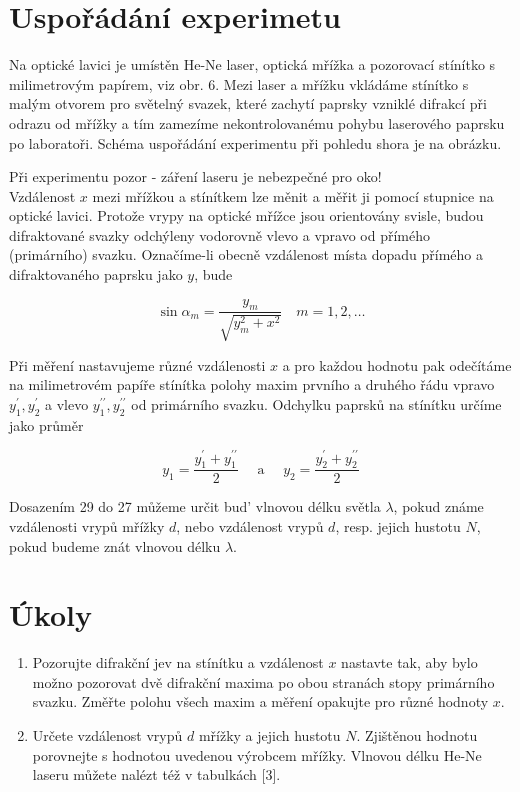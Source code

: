 \documentclass[czech,11pt,a4paper]{article}
\begin{document}
\begin{multicols}{2}
	
	
	\section*{Uspořádání experimetu}
	Na optické lavici je umístěn He-Ne laser, optická mřížka a pozorovací stínítko s milimetrovým papírem, viz obr. 6. Mezi laser a mřížku vkládáme stínítko s malým otvorem pro světelný svazek, které zachytí paprsky vzniklé difrakcí při odrazu od mřížky a tím zamezíme nekontrolovanému pohybu laserového paprsku po laboratoři. Schéma uspořádání experimentu při pohledu shora je na obrázku.
	
	Při experimentu pozor - záření laseru je nebezpečné pro oko!\\
	Vzdálenost $x$ mezi mřížkou a stínítkem lze měnit a měřit ji pomocí stupnice na optické lavici. Protože vrypy na optické mřížce jsou orientovány svisle, budou difraktované svazky odchýleny vodorovně vlevo a vpravo od přímého (primárního) svazku. Označíme-li obecně vzdálenost místa dopadu přímého a difraktovaného paprsku jako $y$, bude
	
	\begin{equation}
		\sin \alpha_{m}=\frac{y_{m}}{\sqrt{y_{m}^{2}+x^{2}}} \quad m=1,2, \ldots
	\end{equation}
	
	
	Při měření nastavujeme různé vzdálenosti $x$ a pro každou hodnotu pak odečítáme na milimetrovém papíře stínítka polohy maxim prvního a druhého řádu vpravo $y_{1}^{\prime}, y_{2}^{\prime}$ a vlevo $y_{1}^{\prime \prime}, y_{2}^{\prime \prime}$ od primárního svazku. Odchylku paprsků na stínítku určíme jako průměr
	
	\begin{equation}
		y_{1}=\frac{y_{1}^{\prime}+y_{1}^{\prime \prime}}{2} \quad \text { a } \quad y_{2}=\frac{y_{2}^{\prime}+y_{2}^{\prime \prime}}{2}
	\end{equation}
	
	
	Dosazením 29 do 27 můžeme určit bud’ vlnovou délku světla $\lambda$, pokud známe vzdálenosti vrypů mřížky $d$, nebo vzdálenost vrypů $d$, resp. jejich hustotu $N$, pokud budeme znát vlnovou délku $\lambda$.
	
	\section*{Úkoly}
	\begin{enumerate}
		\item Pozorujte difrakční jev na stínítku a vzdálenost $x$ nastavte tak, aby bylo možno pozorovat dvě difrakční maxima po obou stranách stopy primárního svazku. Změřte polohu všech maxim a měření opakujte pro různé hodnoty $x$.
		\item Určete vzdálenost vrypů $d$ mřížky a jejich hustotu $N$. Zjištěnou hodnotu porovnejte s hodnotou uvedenou výrobcem mřížky. Vlnovou délku He-Ne laseru můžete nalézt též v tabulkách [3].
	\end{enumerate}
	
	
	
	
	
	
	
	
	
	
\end{multicols}
\end{document}
